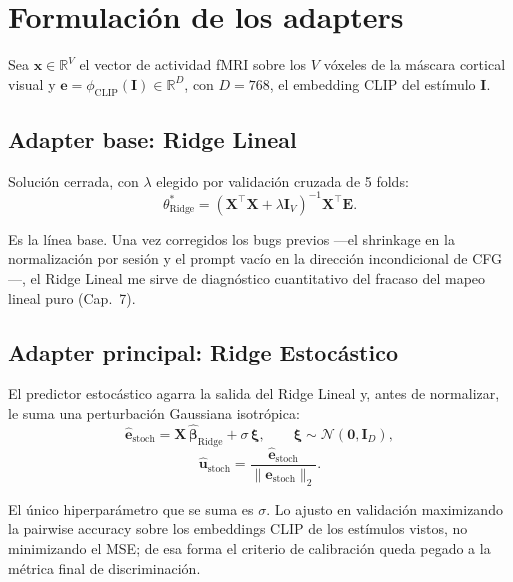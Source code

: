 \section{Formulación de los adapters}

Sea $\mathbf{x}\in\mathbb{R}^{V}$ el vector de actividad fMRI sobre los $V$ vóxeles de la máscara cortical visual y $\mathbf{e}=\phi_{\mathrm{CLIP}}(\mathbf{I})\in\mathbb{R}^{D}$, con $D=768$, el embedding CLIP del estímulo $\mathbf{I}$.

\subsection{Adapter base: Ridge Lineal}

Solución cerrada, con $\lambda$ elegido por validación cruzada de 5 folds:
\begin{equation}
\theta^{*}_{\mathrm{Ridge}} = \left(\mathbf{X}^{\top}\mathbf{X} + \lambda\mathbf{I}_{V}\right)^{-1}\mathbf{X}^{\top}\mathbf{E}.
\end{equation}

Es la línea base. Una vez corregidos los bugs previos ---el shrinkage en la normalización por sesión y el prompt vacío en la dirección incondicional de CFG---, el Ridge Lineal me sirve de diagnóstico cuantitativo del fracaso del mapeo lineal puro (Cap.~7).

\subsection{Adapter principal: Ridge Estocástico}

El predictor estocástico agarra la salida del Ridge Lineal y, antes de normalizar, le suma una perturbación Gaussiana isotrópica:
\begin{equation}
\hat{\mathbf{e}}_{\mathrm{stoch}} = \mathbf{X}\,\hat{\boldsymbol{\beta}}_{\mathrm{Ridge}} + \sigma\,\boldsymbol{\xi}, \qquad \boldsymbol{\xi}\sim\mathcal{N}(\mathbf{0},\mathbf{I}_{D}),
\end{equation}
\begin{equation}
\hat{\mathbf{u}}_{\mathrm{stoch}} = \frac{\hat{\mathbf{e}}_{\mathrm{stoch}}}{\|\hat{\mathbf{e}}_{\mathrm{stoch}}\|_{2}}.
\end{equation}

El único hiperparámetro que se suma es $\sigma$. Lo ajusto en validación maximizando la pairwise accuracy sobre los embeddings CLIP de los estímulos vistos, no minimizando el MSE; de esa forma el criterio de calibración queda pegado a la métrica final de discriminación.

